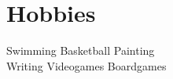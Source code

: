 \section{Hobbies \faGamepad}
Swimming \textbullet{} Basketball \textbullet{} Painting\\ 
Writing \textbullet{} Videogames \textbullet{} Boardgames
\sectionsep